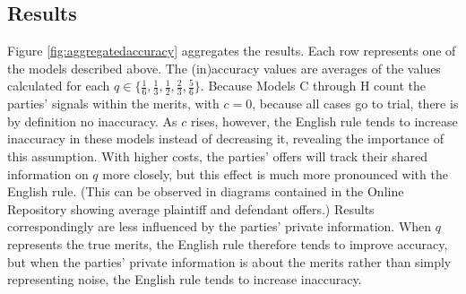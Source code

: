 \documentclass{article}
\begin{document}
\subsection{Results}

Figure \ref{fig:aggregatedaccuracy} aggregates the results. Each row represents one of the models described above. The (in)accuracy values are averages of the values calculated for each $q \in \{ \frac{1}{6}, \frac{1}{3}, \frac{1}{2}, \frac{2}{3}, \frac{5}{6} \}$. Because Models C through H count the parties' signals within the merits, with $c=0$, because all cases go to trial, there is by definition no inaccuracy. As $c$ rises, however, the English rule tends to increase inaccuracy in these models instead of decreasing it, revealing the importance of this assumption. With higher costs, the parties' offers will track their shared information on $q$ more closely, but this effect is much more pronounced with the English rule. (This can be observed in diagrams contained in the Online Repository showing average plaintiff and defendant offers.) Results correspondingly are less influenced by the parties' private information. When $q$ represents the true merits, the English rule therefore tends to improve accuracy, but when the parties' private information is about the merits rather than simply representing noise, the English rule tends to increase inaccuracy.
\end{document}

